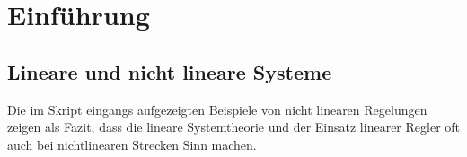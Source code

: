 \section{Einführung}
\subsection{Lineare und nicht lineare Systeme}
Die im Skript eingangs aufgezeigten Beispiele von nicht linearen Regelungen zeigen als Fazit, dass die lineare Systemtheorie und der Einsatz linearer Regler oft auch bei nichtlinearen Strecken Sinn machen.